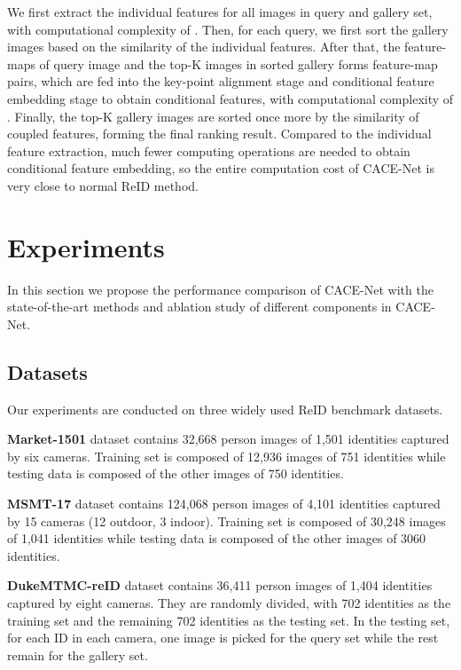 \documentclass[final]{cvpr}
\begin{document}
We first extract the individual features
for all images in query and gallery set, with computational complexity of . Then, for each query, we first sort the gallery images based on the similarity of the individual features. After that, the feature-maps of query image and the top-K images in sorted gallery forms  feature-map pairs, which are fed into the key-point alignment stage and conditional feature embedding stage to obtain conditional features, with computational complexity of . Finally, the top-K gallery images are sorted once more by the similarity of coupled features, forming the final ranking result. Compared to the individual feature extraction,  much fewer computing operations are needed to obtain conditional feature embedding, so the entire computation cost of CACE-Net is very close to normal ReID method. 

\section{Experiments}

In this section we propose the performance comparison of CACE-Net with the state-of-the-art methods and ablation study of different components in CACE-Net. 

\subsection{Datasets }
Our experiments are conducted on three widely used ReID benchmark datasets. 

\noindent \textbf{Market-1501} \cite{zheng2015scalable}
dataset contains 32,668 person images of 1,501 identities captured by six cameras. Training set is composed of 12,936 images of 751 identities while testing data is composed of the other images of 750 identities. 

\noindent \textbf{MSMT-17} \cite{wei2018person}
dataset contains 124,068 person images of 4,101 identities captured by 15 cameras (12 outdoor, 3 indoor). Training set is composed of 30,248 images of 1,041 identities while testing data is composed of the other images of 3060 identities.  

\noindent \textbf{DukeMTMC-reID} \cite{ristani2016performance}
dataset contains 36,411 person images of 
1,404 identities captured by eight cameras. They are randomly divided, with 702 identities as the training set and the remaining 702 identities as the testing set. In the testing set, for each ID in each camera, one image is picked for the query set while the rest remain for the gallery set.  
\end{document}
